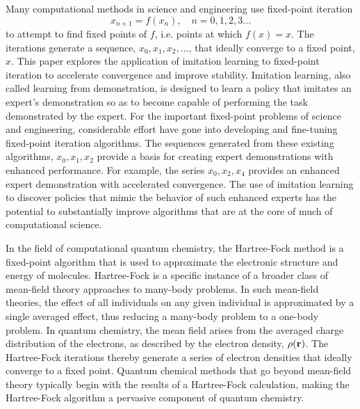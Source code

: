 \documentclass[twoside,11pt]{article}
\begin{document}
Many computational methods in science and engineering use fixed-point iteration
\[
x_{n+1} = f(x_n), \quad n = 0,1,2,3...
\]
to attempt to find fixed points of $f$, i.e. points at which $f(x)=x$. The iterations generate a sequence, $x_0, x_1, x_2, \ldots$, that ideally converge to a fixed point, $x$. This paper explores the application of imitation learning to fixed-point iteration to accelerate convergence and improve stability. Imitation learning, also called learning from demonstration, is designed to learn a policy that imitates an expert's demonstration so as to become capable of performing the task demonstrated by the expert. For the important fixed-point problems of science and engineering, considerable effort have gone into developing and fine-tuning fixed-point iteration algorithms. The sequences generated from these existing algorithms, $x_0, x_1, x_2$  provide a basis for creating expert demonstrations with enhanced performance. For example, the series $x_0, x_2, x_4$ provides an enhanced expert demonstration with accelerated convergence. The use of imitation learning to discover policies that mimic the behavior of such enhanced experts has the potential to substantially improve algorithms that are at the core of much of computational science.


In the field of computational quantum chemistry, the Hartree-Fock method is a fixed-point algorithm that is used to approximate the electronic structure and energy of molecules. Hartree-Fock is a specific instance of a broader class of mean-field theory approaches to many-body problems. In such mean-field theories, the effect of all individuals on any given individual is approximated by a single averaged effect, thus reducing a many-body problem to a one-body problem. In quantum chemistry, the mean field arises from the averaged charge distribution of the electrons, as described by the electron density, $\rho({\bf r})$. The Hartree-Fock iterations thereby generate a series of electron densities that ideally converge to a fixed point. Quantum chemical methods that go beyond mean-field theory typically begin with the results of a Hartree-Fock calculation, making the Hartree-Fock algorithm a pervasive component of quantum chemistry.\cite{Some authoritative review of electronic-structure theory}
\end{document}

